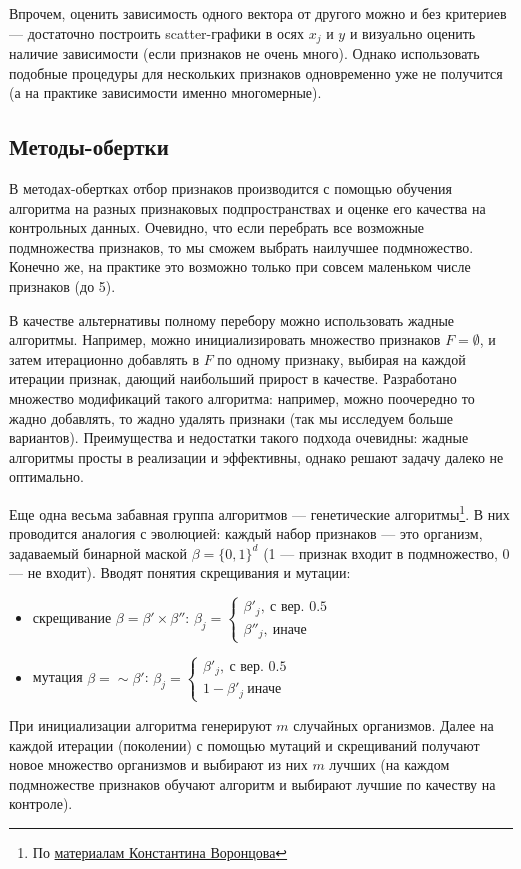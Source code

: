 \documentclass[12pt,a4paper]{article}
\begin{document}
	\vspace{0.5cm}
	Впрочем, оценить зависимость одного вектора от другого можно и без критериев --- достаточно построить scatter-графики в осях $x_j$ и $y$ и визуально оценить наличие зависимости (если признаков не очень много). Однако использовать подобные процедуры для нескольких признаков одновременно уже не получится (а на практике зависимости именно многомерные).
	
	\subsection{Методы-обертки}
	В методах-обертках отбор признаков производится  с помощью обучения алгоритма на разных признаковых подпространствах и оценке его качества на контрольных данных. Очевидно, что если перебрать все возможные подмножества признаков, то мы сможем выбрать наилучшее подмножество. Конечно же, на практике это возможно только при совсем маленьком числе признаков (до 5).
	
	В качестве альтернативы полному перебору можно использовать жадные алгоритмы. Например, можно инициализировать множество признаков $F = \emptyset$, и затем итерационно добавлять в $F$ по одному признаку, выбирая на каждой итерации признак, дающий наибольший прирост в качестве. Разработано множество модификаций такого алгоритма: например, можно поочередно то жадно добавлять, то жадно удалять признаки (так мы исследуем больше вариантов). Преимущества и недостатки такого подхода очевидны: жадные алгоритмы просты в реализации и эффективны, однако решают задачу далеко не оптимально.
	
	Еще одна весьма забавная группа алгоритмов --- генетические алгоритмы\footnote{По \href{http://www.machinelearning.ru/wiki/images/archive/4/4f/20111004204412\%21Voron-ML-Modeling-slides.pdf}{материалам Константина Воронцова}}. В них проводится аналогия с эволюцией: каждый набор признаков --- это организм, задаваемый бинарной маской $\beta = \{0, 1\}^d$ (1 --- признак входит в подмножество, 0 --- не входит). Вводят понятия скрещивания и мутации:
	\begin{itemize}
		\item скрещивание $\beta=\beta' \times \beta''$: $\beta_j = \begin{cases} \beta'_j, ~\text{с вер. 0.5}\\ \beta''_j, ~\text{иначе }\end{cases}$
		\item мутация $\beta = \sim \beta'$: $\beta_j = \begin{cases} \beta'_j, ~\text{с вер. 0.5}\\ 1-\beta'_j ~\text{иначе }\end{cases}$
	\end{itemize}
    При инициализации алгоритма генерируют $m$ случайных организмов. Далее на каждой итерации (поколении) с помощью мутаций и скрещиваний получают новое множество организмов и выбирают из них $m$ лучших (на каждом подмножестве признаков обучают алгоритм и выбирают лучшие по качеству на контроле). 
	
\end{document}
